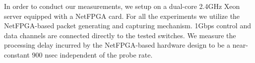 In order to conduct our measurements, we setup \oflops on a dual-core
2.4GHz Xeon server equipped with a NetFPGA card.
For all the experiments we utilize the NetFPGA-based packet generating and 
capturing mechanism. 1Gbps control and data channels are connected directly 
to the tested switches. We measure the processing delay incurred by the 
NetFPGA-based hardware design to be a near-constant $900$ nsec independent 
of the probe rate.
